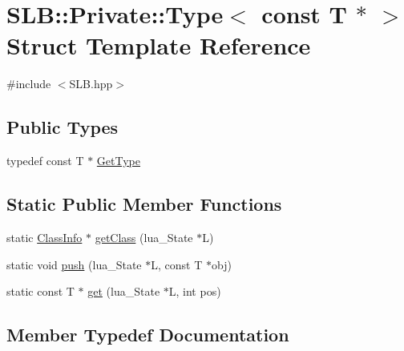 \hypertarget{structSLB_1_1Private_1_1Type_3_01const_01T_01_5_01_4}{}\section{S\+LB\+:\+:Private\+:\+:Type$<$ const T $\ast$ $>$ Struct Template Reference}
\label{structSLB_1_1Private_1_1Type_3_01const_01T_01_5_01_4}


{\ttfamily \#include $<$S\+L\+B.\+hpp$>$}

\subsection*{Public Types}
\begin{DoxyCompactItemize}
\item 
typedef const T $\ast$ \hyperlink{structSLB_1_1Private_1_1Type_3_01const_01T_01_5_01_4_af52566cd22271f9c49f1db6ff5229514}{Get\+Type}
\end{DoxyCompactItemize}
\subsection*{Static Public Member Functions}
\begin{DoxyCompactItemize}
\item 
static \hyperlink{classSLB_1_1ClassInfo}{Class\+Info} $\ast$ \hyperlink{structSLB_1_1Private_1_1Type_3_01const_01T_01_5_01_4_ad2f3164d685a4962e87f969dd44a8039}{get\+Class} (lua\+\_\+\+State $\ast$L)
\item 
static void \hyperlink{structSLB_1_1Private_1_1Type_3_01const_01T_01_5_01_4_a4597208d8c979211413119498be79dc7}{push} (lua\+\_\+\+State $\ast$L, const T $\ast$obj)
\item 
static const T $\ast$ \hyperlink{structSLB_1_1Private_1_1Type_3_01const_01T_01_5_01_4_a9b81cd665e0469be9780a3c2c2a9608b}{get} (lua\+\_\+\+State $\ast$L, int pos)
\end{DoxyCompactItemize}


\subsection{Member Typedef Documentation}
